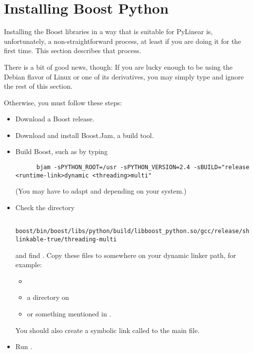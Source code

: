 \section{Installing Boost Python}

\label{sec:install-bpl}

Installing the Boost libraries in a way that is suitable for PyLinear
is, unfortunately, a non-straightforward process, at least if you are
doing it for the first time. This section describes that process.

There is a bit of good news, though: If you are lucky enough to be
using the Debian flavor of Linux or one of its derivatives, you may
simply type  and ignore the
rest of this section.

Otherwise, you must follow these steps:

\begin{itemize}
  \item Download a Boost release.
  \item Download and install Boost.Jam, a build tool.
  \item Build Boost, such as by typing
    \begin{verbatim}
      bjam -sPYTHON_ROOT=/usr -sPYTHON_VERSION=2.4 -sBUILD="release <runtime-link>dynamic <threading>multi"
    \end{verbatim}

    (You may have to adapt  and
     depending on your system.)
  \item Check the directory 
    \begin{verbatim}
      boost/bin/boost/libs/python/build/libboost_python.so/gcc/release/shared-linkable-true/threading-multi
    \end{verbatim}
    and find . Copy these files to somewhere
    on your dynamic linker path, for example:
    \begin{itemize}
    \item {}
    \item a directory on 
    \item or something mentioned in .
    \end{itemize}
    You should also create a symbolic link called 
    to the main  file.

  \item Run .
\end{itemize}

